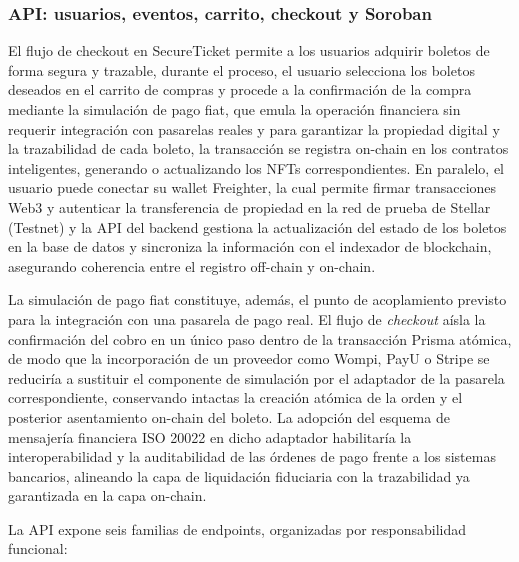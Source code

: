 \subsubsection{API: usuarios, eventos, carrito, checkout y Soroban}

El flujo de checkout en SecureTicket permite a los usuarios adquirir boletos de forma segura y trazable, durante el proceso, el usuario selecciona los boletos deseados en el carrito de compras y procede a la confirmación de la compra mediante la simulación de pago fiat, que emula la operación financiera sin requerir integración con pasarelas reales y para garantizar la propiedad digital y la trazabilidad de cada boleto, la transacción se registra on-chain en los contratos inteligentes, generando o actualizando los NFTs correspondientes. En paralelo, el usuario puede conectar su wallet Freighter, la cual permite firmar transacciones Web3 y autenticar la transferencia de propiedad en la red de prueba de Stellar (Testnet) y la API del backend gestiona la actualización del estado de los boletos en la base de datos y sincroniza la información con el indexador de blockchain, asegurando coherencia entre el registro off-chain y on-chain.

La simulación de pago fiat constituye, además, el punto de acoplamiento previsto para la integración con una
pasarela de pago real. El flujo de \textit{checkout} aísla la confirmación del cobro en un único paso dentro
de la transacción Prisma atómica, de modo que la incorporación de un proveedor como Wompi, PayU o Stripe se
reduciría a sustituir el componente de simulación por el adaptador de la pasarela correspondiente,
conservando intactas la creación atómica de la orden y el posterior asentamiento on-chain del boleto. La
adopción del esquema de mensajería financiera ISO 20022 \cite{iso20022} en dicho adaptador habilitaría la
interoperabilidad y la auditabilidad de las órdenes de pago frente a los sistemas bancarios, alineando la
capa de liquidación fiduciaria con la trazabilidad ya garantizada en la capa on-chain.

La API expone seis familias de endpoints, organizadas por responsabilidad funcional:

